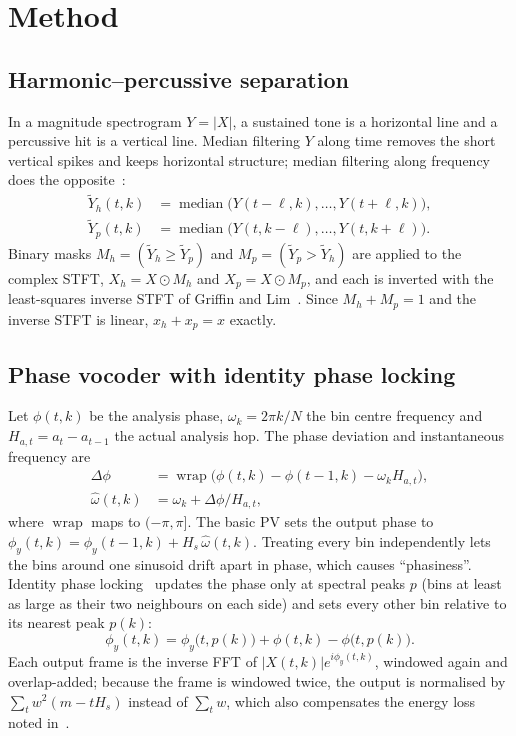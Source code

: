 \documentclass[conference]{IEEEtran}
\begin{document}
\section{Method}
\label{sec:method}

\subsection{Harmonic--percussive separation}
In a magnitude spectrogram $Y=|X|$, a sustained tone is a horizontal line and a percussive hit is a vertical line. Median filtering $Y$ along time removes the short vertical spikes and keeps horizontal structure; median filtering along frequency does the opposite~\cite{fitzgerald10}:
\begin{align}
\tilde Y_h(t,k)&=\operatorname{median}\big(Y(t-\ell,k),\dots,Y(t+\ell,k)\big),\label{eq:medh}\\
\tilde Y_p(t,k)&=\operatorname{median}\big(Y(t,k-\ell),\dots,Y(t,k+\ell)\big).\label{eq:medp}
\end{align}
Binary masks $M_h=(\tilde Y_h\ge\tilde Y_p)$ and $M_p=(\tilde Y_p>\tilde Y_h)$ are applied to the complex STFT, $X_h=X\odot M_h$ and $X_p=X\odot M_p$, and each is inverted with the least-squares inverse STFT of Griffin and Lim~\cite{griffin84}. Since $M_h+M_p=1$ and the inverse STFT is linear, $x_h+x_p=x$ exactly.

\subsection{Phase vocoder with identity phase locking}
Let $\phi(t,k)$ be the analysis phase, $\omega_k=2\pi k/N$ the bin centre frequency and $H_{a,t}=a_t-a_{t-1}$ the actual analysis hop. The phase deviation and instantaneous frequency are
\begin{align}
\Delta\phi&=\operatorname{wrap}\big(\phi(t,k)-\phi(t-1,k)-\omega_k H_{a,t}\big),\\
\hat\omega(t,k)&=\omega_k+\Delta\phi/H_{a,t},
\end{align}
where $\operatorname{wrap}$ maps to $(-\pi,\pi]$. The basic PV sets the output phase to $\phi_y(t,k)=\phi_y(t-1,k)+H_s\,\hat\omega(t,k)$. Treating every bin independently lets the bins around one sinusoid drift apart in phase, which causes ``phasiness''. Identity phase locking~\cite{laroche99} updates the phase only at spectral peaks $p$ (bins at least as large as their two neighbours on each side) and sets every other bin relative to its nearest peak $p(k)$:
\begin{equation}
\phi_y(t,k)=\phi_y\big(t,p(k)\big)+\phi(t,k)-\phi\big(t,p(k)\big).
\end{equation}
Each output frame is the inverse FFT of $|X(t,k)|e^{i\phi_y(t,k)}$, windowed again and overlap-added; because the frame is windowed twice, the output is normalised by $\sum_t w^2(m-tH_s)$ instead of $\sum_t w$, which also compensates the energy loss noted in~\cite{driedger14}.
\end{document}
